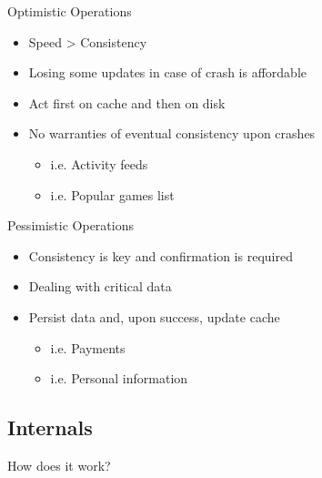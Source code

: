 \documentclass[aspectratio=43]{beamer}
\begin{document}
\begin{frame}{Optimistic Operations}
    \begin{itemize}
        \item Speed > Consistency
        \item Losing some updates in case of crash is affordable
        \item Act first on cache and then on disk
        \item No warranties of eventual consistency upon crashes
            \begin{itemize}
                \item i.e. Activity feeds
                \item i.e. Popular games list
            \end{itemize}
    \end{itemize}
\end{frame}

\begin{frame}{Pessimistic Operations}
    \begin{itemize}
        \item Consistency is key and confirmation is required
        \item Dealing with critical data
        \item Persist data and, upon success, update cache
            \begin{itemize}
                \item i.e. Payments
                \item i.e. Personal information
            \end{itemize}
    \end{itemize}
\end{frame}

\subsection{Internals}
{
\begin{frame}{How does it work?}
\end{frame}
}
\end{document}
